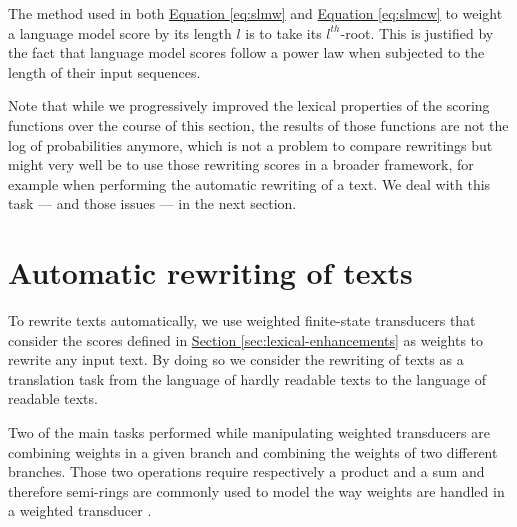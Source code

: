 \documentclass[a4paper, 11pt, onepage]{scrreprt}
\newcommand\sectionref[1]{\hyperref[#1]{Section \ref*{#1}}}
\newcommand\equaref[1]{\hyperref[#1]{Equation \ref*{#1}}}
\begin{document}
The method used in both \equaref{eq:slmw} and \equaref{eq:slmcw} to
weight a language model score by its length $l$ is to take its
$l^{th}$-root. This is justified by the fact that language model
scores follow a power law when subjected to the length of their input
sequences.

Note that while we progressively improved the lexical properties of
the scoring functions over the course of this section, the results of
those functions are not the log of probabilities anymore, which is not
a problem to compare rewritings but might very well be to use those
rewriting scores in a broader framework, for example when performing
the automatic rewriting of a text. We deal with this task — and those
issues — in the next section.

\section{Automatic rewriting of texts}
\label{sec:rewriting}


To rewrite texts automatically, we use weighted finite-state
transducers that consider the scores defined
in \sectionref{sec:lexical-enhancements} as weights to rewrite any
input text. By doing so we consider the rewriting of texts as a
translation task from the language of hardly readable texts to the
language of readable texts.

Two of the main tasks performed while manipulating weighted
transducers are combining weights in a given branch and combining the
weights of two different branches. Those two operations require
respectively a product and a sum and therefore semi-rings are commonly
used to model the way weights are handled in a weighted transducer
\cite{mohri2004weighted}.
\end{document}
